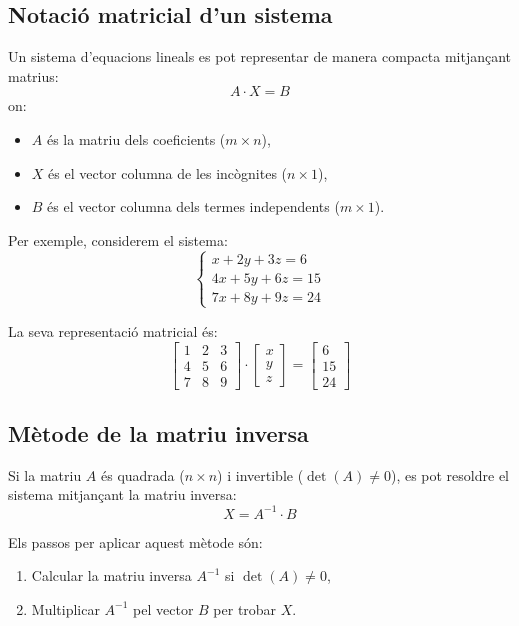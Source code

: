 \documentclass[12pt]{article}
\begin{document}
\subsection{Notació matricial d'un sistema}
\begin{concept}
Un sistema d'equacions lineals es pot representar de manera compacta mitjançant matrius:
\[
A \cdot X = B
\]
on:
\begin{itemize}
    \item \(A\) és la matriu dels coeficients (\(m \times n\)),
    \item \(X\) és el vector columna de les incògnites (\(n \times 1\)),
    \item \(B\) és el vector columna dels termes independents (\(m \times 1\)).
\end{itemize}

Per exemple, considerem el sistema:
\[
\begin{cases}
x + 2y + 3z = 6 \\
4x + 5y + 6z = 15 \\
7x + 8y + 9z = 24
\end{cases}
\]

La seva representació matricial és:
\[
\begin{bmatrix}
1 & 2 & 3 \\
4 & 5 & 6 \\
7 & 8 & 9
\end{bmatrix}
\cdot
\begin{bmatrix}
x \\ y \\ z
\end{bmatrix}
=
\begin{bmatrix}
6 \\ 15 \\ 24
\end{bmatrix}
\]
\end{concept}

\subsection{Mètode de la matriu inversa}
\begin{concept}
Si la matriu \(A\) és quadrada (\(n \times n\)) i invertible (\(\det(A) \neq 0\)), es pot resoldre el sistema mitjançant la matriu inversa:
\[
X = A^{-1} \cdot B
\]

Els passos per aplicar aquest mètode són:
\begin{enumerate}
    \item Calcular la matriu inversa \(A^{-1}\) si \(\det(A) \neq 0\),
    \item Multiplicar \(A^{-1}\) pel vector \(B\) per trobar \(X\).
\end{enumerate}
\end{concept}
\end{document}
